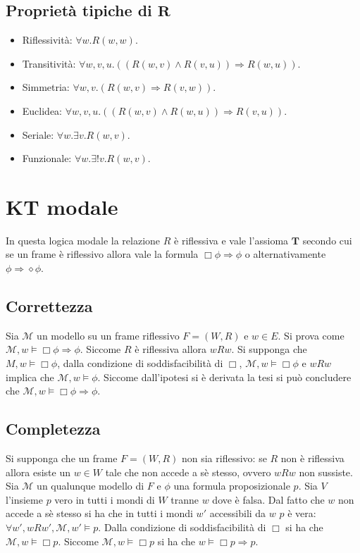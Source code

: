 \subsection{Propriet\`a tipiche di $\mathbf{R}$}
\begin{itemize}
\item Riflessivit\`a: $\forall w.R(w,w)$.
\item Transitivit\`a: $\forall w, v, u.((R(w, v)\land R(v, u))\Rightarrow R(w, u))$.
\item Simmetria: $\forall w, v.(R(w, v)\Rightarrow R(v, w))$.
\item Euclidea: $\forall w, v, u.((R(w, v)\land R(w, u))\Rightarrow R(v, u))$.
\item Seriale: $\forall w.\exists v.R(w, v)$.
\item Funzionale: $\forall w.\exists !v.R(w, v)$.
\end{itemize}
\section{$\mathbf{KT}$ modale}
In questa logica modale la relazione $R$ \`e riflessiva e vale l'assioma $\mathbf{T}$ secondo cui se un frame \`e riflessivo allora vale la formula $\Box\phi\Rightarrow\phi$ o alternativamente $\phi\Rightarrow
\diamond\phi$. 
\subsection{Correttezza}
Sia $\mathcal{M}$ un modello su un frame riflessivo $F=(W, R)$ e $w\in E$. Si prova come $\mathcal{M}, w\models\Box\phi\Rightarrow\phi$. Siccome $R$ \`e riflessiva allora $wRw$. Si supponga che 
$M,w\models\Box\phi$, dalla condizione di soddisfacibilit\`a di $\Box$, $\mathcal{M}, w\models\Box\phi$ e $wRw$ implica che $\mathcal{M}, w \models\phi$. Siccome dall'ipotesi si \`e derivata la tesi si 
pu\`o concludere che $\mathcal{M}, w\models\Box\phi\Rightarrow\phi$.
\subsection{Completezza}
Si supponga che un frame $F=(W, R)$ non sia riflessivo: se $R$ non \`e riflessiva allora esiste un $w\in W$ tale che non accede a s\`e stesso, ovvero $wRw$ non sussiste. Sia $\mathcal{M}$ un qualunque
modello di $F$ e $\phi$ una formula proposizionale $p$. Sia $V$ l'insieme $p$ vero in tutti i mondi di $W$ tranne $w$ dove \`e falsa. Dal fatto che $w$ non accede a s\`e stesso si ha che in tutti i mondi $w'$
accessibili da $w$ $p$ \`e vera: $\forall w', wRw', \mathcal{M}, w'\models p$. Dalla condizione di soddisfacibilit\`a di $\Box$ si ha che $\mathcal{M}, w\models\Box p$. Siccome $\mathcal{M}, w\models\Box 
p$ si ha che $w\models\Box p\Rightarrow p$. 
